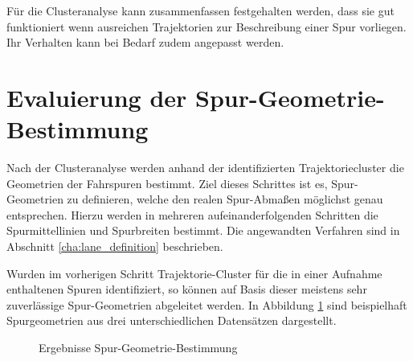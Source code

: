 Für die Clusteranalyse kann zusammenfassen festgehalten werden, dass sie gut funktioniert wenn ausreichen Trajektorien
zur Beschreibung einer Spur vorliegen. Ihr Verhalten kann bei Bedarf zudem angepasst werden.

\section{Evaluierung der Spur-Geometrie-Bestimmung}

Nach der Clusteranalyse werden anhand der identifizierten Trajektoriecluster die Geometrien der Fahrspuren
bestimmt. Ziel dieses Schrittes ist es, Spur-Geometrien zu definieren, welche den realen Spur-Abmaßen möglichst
genau entsprechen. Hierzu werden in mehreren aufeinanderfolgenden Schritten die Spurmittellinien und
Spurbreiten bestimmt. Die angewandten Verfahren sind in Abschnitt \ref{cha:lane_definition} beschrieben.

Wurden im vorherigen Schritt Trajektorie-Cluster für die in einer Aufnahme enthaltenen Spuren identifiziert,
so können auf Basis dieser meistens sehr zuverlässige Spur-Geometrien abgeleitet werden.
In Abbildung \ref{fig:results_laneGeometries} sind beispielhaft Spurgeometrien aus drei unterschiedlichen Datensätzen dargestellt.

\begin{figure}[H]
    \centering
    \caption{Ergebnisse Spur-Geometrie-Bestimmung}
    \label{fig:results_laneGeometries}
\end{figure}

